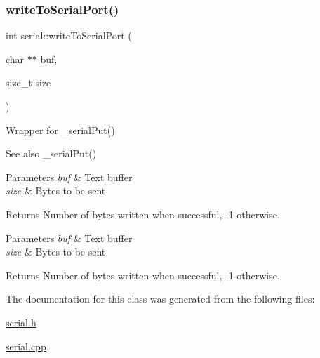 \subsubsection{\texorpdfstring{write\+To\+Serial\+Port()}{writeToSerialPort()}}
{\footnotesize\ttfamily int serial\+::write\+To\+Serial\+Port (\begin{DoxyParamCaption}\item[{char $\ast$$\ast$}]{buf,  }\item[{size\+\_\+t}]{size }\end{DoxyParamCaption})}



Wrapper for \+\_\+serial\+Put() 

\begin{DoxySeeAlso}{See also}
\+\_\+serial\+Put()
\end{DoxySeeAlso}

\begin{DoxyParams}{Parameters}
{\em buf} & Text buffer \\
\hline
{\em size} & Bytes to be sent\\
\hline
\end{DoxyParams}
\begin{DoxyReturn}{Returns}
Number of bytes written when successful, -\/1 otherwise.
\end{DoxyReturn}

\begin{DoxyParams}{Parameters}
{\em buf} & Text buffer \\
\hline
{\em size} & Bytes to be sent\\
\hline
\end{DoxyParams}
\begin{DoxyReturn}{Returns}
Number of bytes written when successful, -\/1 otherwise. 
\end{DoxyReturn}


The documentation for this class was generated from the following files\+:\begin{DoxyCompactItemize}
\item 
\mbox{\hyperlink{serial_8h}{serial.\+h}}\item 
\mbox{\hyperlink{serial_8cpp}{serial.\+cpp}}\end{DoxyCompactItemize}
